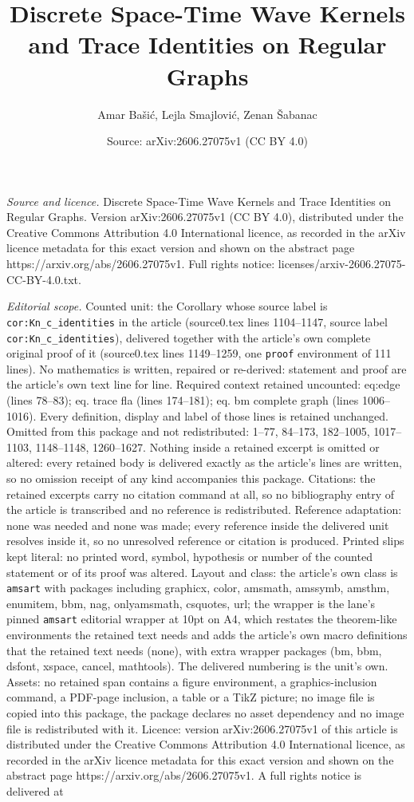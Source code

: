 \documentclass[10pt,a4paper]{amsart}
\title[Discrete Space-Time Wave Kernels and Trace Identities on Reg]{Discrete Space-Time Wave Kernels and Trace Identities on Regular Graphs}
\author{Amar Ba\v{s}i\'c, Lejla Smajlovi\'c, Zenan \v{S}abanac}
\date{Source: arXiv:2606.27075v1 (CC BY 4.0)}
\begin{document}
\maketitle

\noindent\emph{Source and licence.} Discrete Space-Time Wave Kernels and Trace Identities on Regular Graphs. Version arXiv:2606.27075v1 (CC BY 4.0), distributed under the Creative Commons Attribution 4.0 International licence, as recorded in the arXiv licence metadata for this exact version and shown on the abstract page https://arxiv.org/abs/2606.27075v1. Full rights notice: licenses/arxiv-2606.27075-CC-BY-4.0.txt.\par\smallskip

\noindent\textit{Editorial scope.} Counted unit: the Corollary whose source label is \texttt{cor:Kn\_c\_identities} in the article (source0.tex lines 1104--1147, source label \texttt{cor:Kn\_c\_identities}), delivered together with the article's own complete original proof of it (source0.tex lines 1149--1259, one \texttt{proof} environment of 111 lines). No mathematics is written, repaired or re-derived: statement and proof are the article's own text line for line. Required context retained uncounted: eq:edge (lines 78--83); eq. trace fla (lines 174--181); eq. bm complete graph (lines 1006--1016). Every definition, display and label of those lines is retained unchanged. Omitted from this package and not redistributed: 1--77, 84--173, 182--1005, 1017--1103, 1148--1148, 1260--1627. Nothing inside a retained excerpt is omitted or altered: every retained body is delivered exactly as the article's lines are written, so no omission receipt of any kind accompanies this package. Citations: the retained excerpts carry no citation command at all, so no bibliography entry of the article is transcribed and no reference is redistributed. Reference adaptation: none was needed and none was made; every reference inside the delivered unit resolves inside it, so no unresolved reference or citation is produced. Printed slips kept literal: no printed word, symbol, hypothesis or number of the counted statement or of its proof was altered. Layout and class: the article's own class is \texttt{amsart} with packages including graphicx, color, amsmath, amssymb, amsthm, enumitem, bbm, nag, onlyamsmath, csquotes, url; the wrapper is the lane's pinned \texttt{amsart} editorial wrapper at 10pt on A4, which restates the theorem-like environments the retained text needs and adds the article's own macro definitions that the retained text needs (none), with extra wrapper packages (bm, bbm, dsfont, xspace, cancel, mathtools). The delivered numbering is the unit's own. Assets: no retained span contains a figure environment, a graphics-inclusion command, a PDF-page inclusion, a table or a TikZ picture; no image file is copied into this package, the package declares no asset dependency and no image file is redistributed with it. Licence: version arXiv:2606.27075v1 of this article is distributed under the Creative Commons Attribution 4.0 International licence, as recorded in the arXiv licence metadata for this exact version and shown on the abstract page https://arxiv.org/abs/2606.27075v1. A full rights notice is delivered at 
\end{document}
